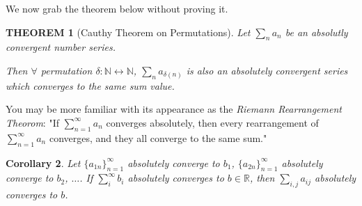 \documentclass[12pt]{article}
\theoremstyle{blueplain}
\newtheorem{theorem}{THEOREM}[section]
\newtheorem{corollary}[theorem]{Corollary}
\theoremstyle{bluedef}
\theoremstyle{blueremark}
\newcommand{\R}{\mathbb{R}}
\newcommand{\N}{\mathbb{N}}
\numberwithin{equation}{section}
\begin{document}
We now grab the theorem below without proving it.

\begin{theorem}[Cauthy Theorem on Permutations]

  Let $\sum_n a_n$ be an absolutly convergent number series.

  Then $\forall$ permutation $\delta: \N \leftrightarrow \N$, $\sum_n a_{\delta(n)}$ is also an absolutely convergent series which converges to the same sum value.
\end{theorem}

You may be more familiar with its appearance as the \textit{Riemann Rearrangement Theorom}: "If $\sum_{n=1}^{\infty} a_n$ converges absolutely, then every rearrangement of $\sum_{n=1}^{\infty} a_n$ converges, and they all converge to the same sum."

\begin{corollary}
  Let $\{a_{1n}\}_{n=1}^{\infty}$ absolutely converge to $b_1$,
  $\{a_{2n}\}_{n=1}^{\infty}$ absolutely converge to $b_2$, $\ldots$. If $\sum_i^{\infty} b_i$ absolutely converges to $b \in \R$, then $\sum_{i,j} a_{ij}$ absolutely converges to $b$.
\end{corollary}
\end{document}
